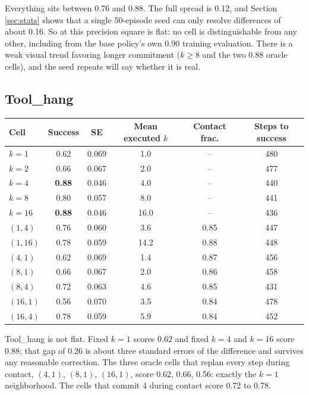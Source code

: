 \documentclass[11pt]{article}
\begin{document}
Everything sits between 0.76 and 0.88. The full spread is 0.12, and Section
\ref{sec:stats} shows that a single 50-episode seed can only resolve differences of
about 0.16. So at this precision square is flat: no cell is distinguishable from
any other, including from the base policy's own 0.90 training evaluation. There is
a weak visual trend favoring longer commitment ($k{\geq}8$ and the two 0.88 oracle
cells), and the seed repeats will say whether it is real.

\subsection{Tool\_hang}

\begin{center}
\small
\begin{tabular}{@{}lccccc@{}}
\toprule
Cell & Success & SE & Mean executed $k$ & Contact frac. & Steps to success \\
\midrule
$k{=}1$        & 0.62 & 0.069 & 1.0  & --   & 480 \\
$k{=}2$        & 0.66 & 0.067 & 2.0  & --   & 477 \\
$k{=}4$        & \textbf{0.88} & 0.046 & 4.0  & --   & 440 \\
$k{=}8$        & 0.80 & 0.057 & 8.0  & --   & 441 \\
$k{=}16$       & \textbf{0.88} & 0.046 & 16.0 & --   & 436 \\
\midrule
$(1,4)$        & 0.76 & 0.060 & 3.6  & 0.85 & 447 \\
$(1,16)$       & 0.78 & 0.059 & 14.2 & 0.88 & 448 \\
$(4,1)$        & 0.62 & 0.069 & 1.4  & 0.87 & 456 \\
$(8,1)$        & 0.66 & 0.067 & 2.0  & 0.86 & 458 \\
$(8,4)$        & 0.72 & 0.063 & 4.6  & 0.85 & 431 \\
$(16,1)$       & 0.56 & 0.070 & 3.5  & 0.84 & 478 \\
$(16,4)$       & 0.78 & 0.059 & 5.9  & 0.84 & 452 \\
\bottomrule
\end{tabular}
\end{center}

Tool\_hang is not flat. Fixed $k{=}1$ scores 0.62 and fixed $k{=}4$ and $k{=}16$
score 0.88; that gap of 0.26 is about three standard errors of the difference and
survives any reasonable correction. The three oracle cells that replan every step
during contact, $(4,1)$, $(8,1)$, $(16,1)$, score 0.62, 0.66, 0.56: exactly the
$k{=}1$ neighborhood. The cells that commit 4 during contact score 0.72 to 0.78.
\end{document}
